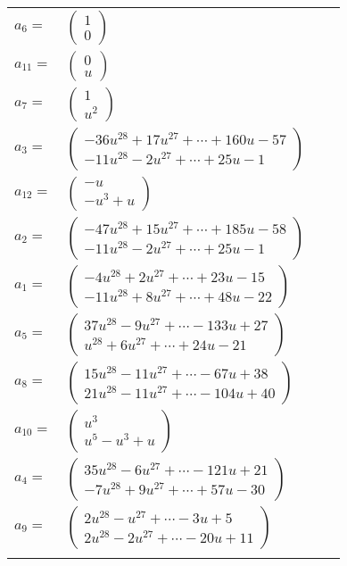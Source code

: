 \documentclass[1p]{elsarticle_modified}
\theoremstyle{definition}
\begin{document}
\begin{tabular}{m{7pt} m{180pt} m{7pt} m{180pt} }
\flushright $a_{6}=$&$\begin{pmatrix}1\\0\end{pmatrix}$ \\
\flushright $a_{11}=$&$\begin{pmatrix}0\\u\end{pmatrix}$ \\
\flushright $a_{7}=$&$\begin{pmatrix}1\\u^2\end{pmatrix}$ \\
\flushright $a_{3}=$&$\begin{pmatrix}-36 u^{28}+17 u^{27}+\cdots+160 u-57\\-11 u^{28}-2 u^{27}+\cdots+25 u-1\end{pmatrix}$ \\
\flushright $a_{12}=$&$\begin{pmatrix}- u\\- u^3+u\end{pmatrix}$ \\
\flushright $a_{2}=$&$\begin{pmatrix}-47 u^{28}+15 u^{27}+\cdots+185 u-58\\-11 u^{28}-2 u^{27}+\cdots+25 u-1\end{pmatrix}$ \\
\flushright $a_{1}=$&$\begin{pmatrix}-4 u^{28}+2 u^{27}+\cdots+23 u-15\\-11 u^{28}+8 u^{27}+\cdots+48 u-22\end{pmatrix}$ \\
\flushright $a_{5}=$&$\begin{pmatrix}37 u^{28}-9 u^{27}+\cdots-133 u+27\\u^{28}+6 u^{27}+\cdots+24 u-21\end{pmatrix}$ \\
\flushright $a_{8}=$&$\begin{pmatrix}15 u^{28}-11 u^{27}+\cdots-67 u+38\\21 u^{28}-11 u^{27}+\cdots-104 u+40\end{pmatrix}$ \\
\flushright $a_{10}=$&$\begin{pmatrix}u^3\\u^5- u^3+u\end{pmatrix}$ \\
\flushright $a_{4}=$&$\begin{pmatrix}35 u^{28}-6 u^{27}+\cdots-121 u+21\\-7 u^{28}+9 u^{27}+\cdots+57 u-30\end{pmatrix}$ \\
\flushright $a_{9}=$&$\begin{pmatrix}2 u^{28}- u^{27}+\cdots-3 u+5\\2 u^{28}-2 u^{27}+\cdots-20 u+11\end{pmatrix}$\\&\end{tabular}
\end{document}
